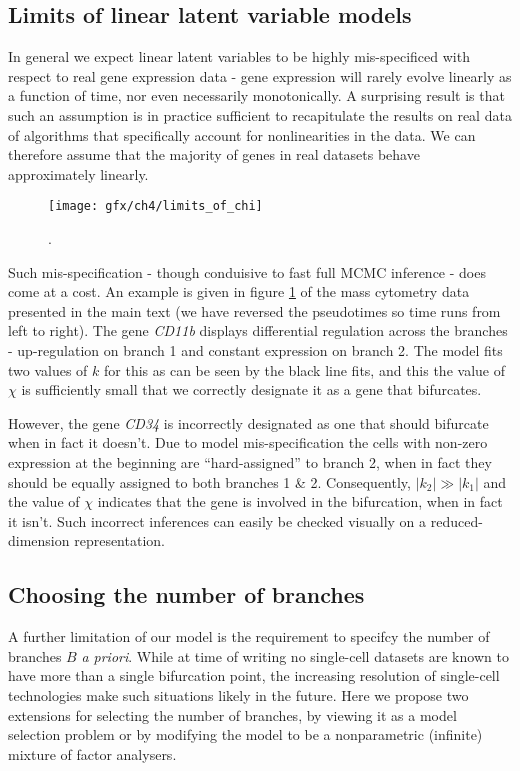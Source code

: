 \subsection{Limits of linear latent variable models}

In general we expect linear latent variables to be highly mis-specificed with respect to real gene expression data - gene expression will rarely evolve linearly as a function of time, nor even necessarily monotonically. A surprising result is that such an assumption is in practice sufficient to recapitulate the results on real data of algorithms that specifically account for nonlinearities in the data. We can therefore assume that the majority of genes in real datasets behave approximately linearly.

\begin{figure}
	\centering
	\texttt{[image: gfx/ch4/limits\_of\_chi]}
	\caption{.} \label{fig:chi}
\end{figure}

Such mis-specification - though conduisive to fast full MCMC inference - does come at a cost. An example is given in figure \ref{fig:chi} of the mass cytometry data presented in the main text (we have reversed the pseudotimes so time runs from left to right). The gene \emph{CD11b} displays differential regulation across the branches - up-regulation on branch 1 and constant expression on branch 2. The model fits two values of $k$ for this as can be seen by the black line fits, and this the value of $\chi$ is sufficiently small that we correctly designate it as a gene that bifurcates.

However, the gene \emph{CD34} is incorrectly designated as one that should bifurcate when in fact it doesn't. Due to model mis-specification the cells with non-zero expression at the beginning are ``hard-assigned'' to branch 2, when in fact they should be equally assigned to both branches 1 \& 2. Consequently, $|k_2| \gg |k_1|$ and the value of $\chi$ indicates that the gene is involved in the bifurcation, when in fact it isn't. Such incorrect inferences can easily be checked visually on a reduced-dimension representation.

\subsection{Choosing the number of branches}

A further limitation of our model is the requirement to specifcy the number of branches $B$ \emph{a priori}. While at time of writing no single-cell datasets are known to have more than a single bifurcation point, the increasing resolution of single-cell technologies make such situations likely in the future. Here we propose two extensions for selecting the number of branches, by viewing it as a model selection problem or by modifying the model to be a nonparametric (\ie infinite) mixture of factor analysers.

